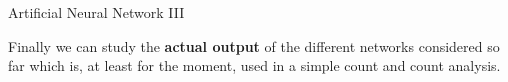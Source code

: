 \documentclass[8 pt]{beamer}
\begin{document}
\begin{frame}{Artificial Neural Network III}

	\justifying
	Finally we can study the \textbf{actual output} of the different networks considered so far which is, at least for the moment, used in a simple count and count analysis. \vfill
	
	\hspace{4pt}
   \begin{minipage}[c]{.02\linewidth}
	\begin{exampleblock}{}  \end{exampleblock}
   \end{minipage}
   \hspace{5pt}
	\begin{minipage}[c]{.44\linewidth}
   \end{minipage} \hfill
   \hspace{10pt}
   \begin{minipage}[c]{.44\linewidth}
   \end{minipage} \hfill \vfill
   

\end{frame}
\end{document}
